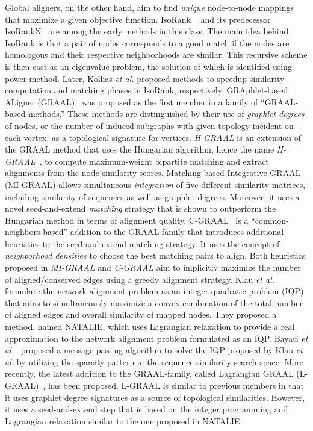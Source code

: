 \documentclass[10pt, journal, compsoc, final]{IEEEtran}
\begin{document}
Global aligners, on the other hand, aim to find \textit{unique} node-to-node mappings that maximize a given objective function.
IsoRank ~\cite{IsoRank1, IsoRank2} and its predecessor IsoRankN~\cite{IsoRankN} are among the early methods in this class. The main idea behind IsoRank is that a pair of nodes corresponds to a good match if the nodes are homologous and their respective neighborhoods are similar. This recursive scheme is then cast as an eigenvalue problem, the solution of which is identified using power method. Later, Kollias \textit{et al.} \cite{NSD,FastAlign} proposed methods to speedup similarity computation and matching phases in IsoRank, respectively. GRAphlet-based ALigner (GRAAL)~\cite{GRAAL} was proposed as the first member in a family of ``GRAAL-based methods.'' These methods are distinguished by their use of \textit{graphlet degrees} of nodes, or the number of induced subgraphs with given topology incident on each vertex, as a topological signature for vertices. \textit{H-GRAAL} is an extension of the GRAAL method that uses the Hungarian algorithm, hence the name \textit{H-GRAAL}~\cite{H-GRAAL}, to compute maximum-weight bipartite matching and extract alignments from the node similarity scores. Matching-based Integrative GRAAL (MI-GRAAL) \cite{MI-GRAAL} allows simultaneous \textit{integration} of five different similarity matrices, including similarity of sequences as well as graphlet degrees. Moreover, it uses a novel seed-and-extend \textit{matching} strategy that is shown to outperform the Hungarian method in terms of alignment quality. C-GRAAL~\cite{C-GRAAL} is a ``common-neighbors-based'' addition to the GRAAL family that introduces additional heuristics to the seed-and-extend matching strategy. It uses the concept of \textit{neighborhood densities} to choose the best matching pairs to align. Both heuristics proposed in \textit{MI-GRAAL} and \textit{C-GRAAL} aim to implicitly maximize the number of aligned/conserved edges using a greedy alignment strategy. Klau \textit{et al.}~\cite{Natalie1,Natalie2} formulate the network alignment problem as an integer quadratic problem (IQP) that aims to simultaneously maximize a convex combination of the total  number of aligned edges and overall similarity of mapped nodes. They proposed a method, named NATALIE, which uses Lagrangian relaxation to provide a real approximation to the network alignment problem formulated as an IQP. Bayati \textit{et al.}~\cite{Bayati-2013-netalign} proposed a message passing algorithm to solve the IQP proposed by Klau \textit{et al.} by utilizing the sparsity pattern in the sequence similarity search space. More recently, the latest addition to the GRAAL-family, called Lagrangian GRAAL (L-GRAAL)~\cite{L-GRAAL}, has been proposed. L-GRAAL is similar to previous members in that it uses graphlet degree signatures as a source of topological similarities. However, it uses a seed-and-extend step that is based on the integer programming and Lagrangian relaxation similar to the one proposed in NATALIE.
\end{document}
